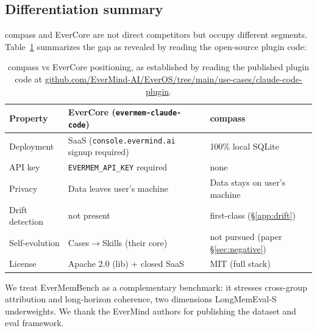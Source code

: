 \subsection{Differentiation summary}

compass and EverCore are not direct competitors but occupy different
segments. Table~\ref{tab:em-positioning} summarizes the gap as
revealed by reading the open-source plugin code:

\begin{table}[h]
\centering
\small
\begin{tabular}{lll}
\toprule
Property & EverCore (\texttt{evermem-claude-code}) & compass \\
\midrule
Deployment & SaaS (\texttt{console.evermind.ai} signup required) & 100\% local SQLite \\
API key & \texttt{EVERMEM\_API\_KEY} required & none \\
Privacy & Data leaves user's machine & Data stays on user's machine \\
Drift detection & not present & first-class (§\ref{app:drift}) \\
Self-evolution & Cases$\to$Skills (their core) & not pursued (paper §\ref{sec:negative}) \\
License & Apache 2.0 (lib) + closed SaaS & MIT (full stack) \\
\bottomrule
\end{tabular}
\caption{compass vs EverCore positioning, as established by reading
the published plugin code at
\url{github.com/EverMind-AI/EverOS/tree/main/use-cases/claude-code-plugin}.}
\label{tab:em-positioning}
\end{table}

We treat EverMemBench as a complementary benchmark: it stresses
cross-group attribution and long-horizon coherence, two dimensions
LongMemEval-S underweights. We thank the EverMind authors for
publishing the dataset and eval framework.
